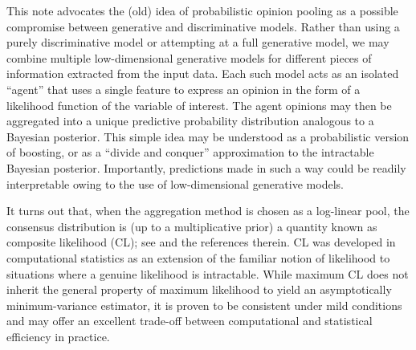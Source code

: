 \documentclass[english]{scrartcl}
\begin{document}
This note advocates the (old) idea of probabilistic opinion pooling \cite{Genest-86} as a possible compromise between generative and discriminative models. Rather than using a purely discriminative model or attempting at a full generative model, we may combine multiple low-dimensional generative models for different pieces of information extracted from the input data. Each such model acts as an isolated ``agent'' that uses a single feature to express an opinion in the form of a likelihood function of the variable of interest. The agent opinions may then be aggregated into a unique predictive probability distribution analogous to a Bayesian posterior. This simple idea may be understood as a probabilistic version of boosting, or as a ``divide and conquer'' approximation to the intractable Bayesian posterior. Importantly, predictions made in such a way could be readily interpretable owing to the use of low-dimensional generative models.

It turns out that, when the aggregation method is chosen as a log-linear pool, the consensus distribution is (up to a multiplicative prior) a quantity known as composite likelihood (CL); see \cite{Varin-11} and the references therein. CL was developed in computational statistics as an extension of the familiar notion of likelihood to situations where a genuine likelihood is intractable. While maximum CL does not inherit the general property of maximum likelihood to yield an asymptotically minimum-variance estimator, it is proven to be consistent under mild conditions \cite{Xu-11} and may offer an excellent trade-off between computational and statistical efficiency in practice.


\end{document}
